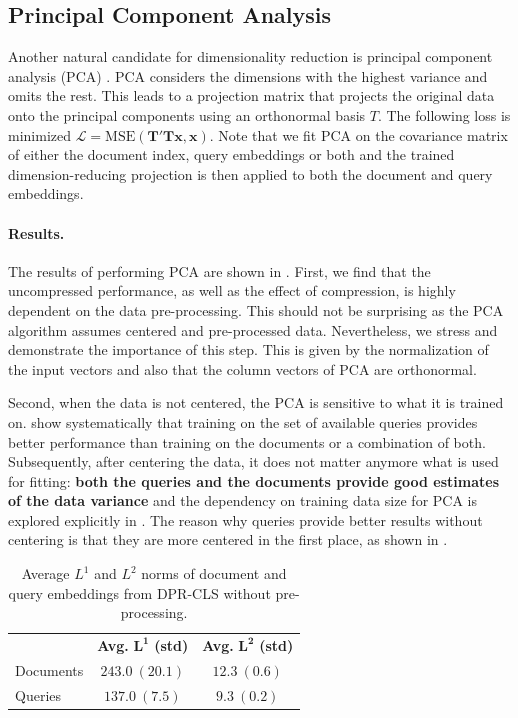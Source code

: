 \subsection{Principal Component Analysis}

Another natural candidate for dimensionality reduction is principal component analysis (PCA) \citep{pca}.
PCA considers the dimensions with the highest variance and omits the rest.
This leads to a projection matrix that projects the original data onto the principal components using an orthonormal basis $T$.
The following loss is minimized $\mathcal{L} = \text{MSE}(\mathbf{T'} \mathbf{T} \bm{x}, \bm{x})$.
Note that we fit PCA on the covariance matrix of either the document index, query embeddings or both and the trained dimension-reducing projection is then applied to both the document and query embeddings.

\paragraph{Results.} The results of performing PCA are shown in . First, we find that the uncompressed performance, as well as the effect of compression, is highly dependent on the data pre-processing.
This should not be surprising as the PCA algorithm assumes centered and pre-processed data. Nevertheless, we stress and demonstrate the importance of this step.
This is given by the normalization of the input vectors and also that the column vectors of PCA are orthonormal.

Second, when the data is not centered, the PCA is sensitive to what it is trained on.
 show systematically that training on the set of available queries provides better performance than training on the documents or a combination of both. Subsequently, after centering the data, it does not matter anymore what is used for fitting: \textbf{both the queries and the documents provide good estimates of the data variance} and the dependency on training data size for PCA is explored explicitly in .
The reason why queries provide better results without centering is that they are more centered in the first place, as shown in .

\begin{table}[ht]
\center
    \begin{tabular}{lcc}
    \toprule
    & \textbf{Avg.} $\mathbf{L^1}$ \textbf{(std)} & \textbf{Avg.} $\mathbf{L^2}$ \textbf{(std)} \\
    \cmidrule{2-3}
    Documents & $243.0\ (20.1)$ & $12.3\ (0.6)$ \\
    Queries & $137.0\ (7.5)$ & $9.3\ (0.2)$ \\
    \bottomrule
\end{tabular}
\caption{Average $L^1$ and $L^2$ norms of document and query embeddings from DPR-CLS without pre-processing.}
\label{tab:dataset_norm}
\end{table}

